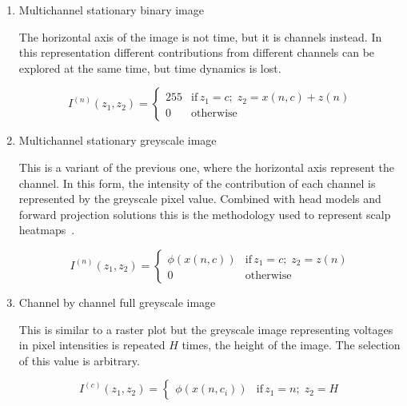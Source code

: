 \begin{enumerate}
\item Multichannel stationary binary image

The horizontal axis of the image is not time, but it is channels instead.   In this representation different contributions from different channels can be explored at the same time, but time dynamics is lost.  

\begin{equation}
I^{(n)}(z_1,z_2) = \left\{ \begin{array}{rl}
255 & \text{if} \,  z_1 = c; \; z_2 =  x(n,c) + z(n) \\
0   & \mbox{otherwise}
\end{array}\right.
\label{eq:images}
\end{equation}

\item Multichannel stationary greyscale image

This is a variant of the previous one, where the horizontal axis represent the channel.   In this form, the intensity of the contribution of each channel is represented by the greyscale pixel value.  Combined with head models and forward projection solutions this is the methodology used to represent scalp heatmaps~\cite{Gramfort2013}.

\begin{equation}
I^{(n)}(z_1,z_2)= \left\{ \begin{array}{rl}
\phi(x(n,c)) & \text{if} \,  z_1 = c; \; z_2 =  z(n) \\
0   & \mbox{otherwise}
\end{array}\right.
\label{eq:images}
\end{equation}


\item Channel by channel full greyscale image

This is similar to a raster plot but the greyscale image representing voltages in pixel intensities is repeated $H$ times, the height of the image.  The selection of this value is arbitrary.

\begin{equation}
I^{(c)}(z_1,z_2) = \left\{ \begin{array}{rl} \phi(x(n,c_i))  & \text{if} \,  z_1 = n; \; z_2 = H \end{array}\right.
\label{eq:images}
\end{equation}


\end{enumerate}

